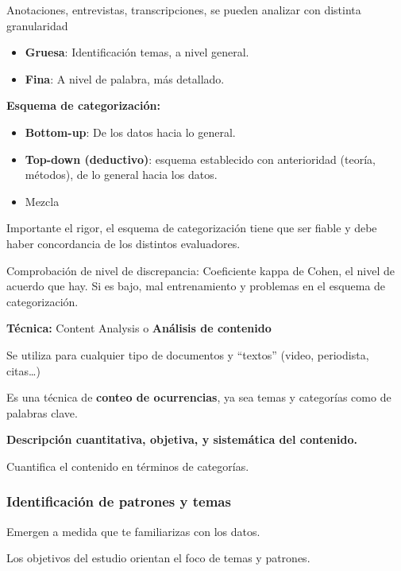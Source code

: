 \documentclass[12pt]{report} %
\begin{document}
Anotaciones, entrevistas, transcripciones, se pueden analizar con
distinta granularidad

\begin{itemize}

\item
  \textbf{Gruesa}: Identificación temas, a nivel general.
\item
  \textbf{Fina}: A nivel de palabra, más detallado.
\end{itemize}

\textbf{Esquema de categorización:}

\begin{itemize}

\item
  \textbf{Bottom-up}: De los datos hacia lo general.
\item
  \textbf{Top-down (deductivo)}: esquema establecido con anterioridad
  (teoría, métodos), de lo general hacia los datos.
\item
  Mezcla
\end{itemize}

Importante el rigor, el esquema de categorización tiene que ser fiable y
debe haber concordancia de los distintos evaluadores.

Comprobación de nivel de discrepancia: Coeficiente kappa de Cohen, el
nivel de acuerdo que hay. Si es bajo, mal entrenamiento y problemas en
el esquema de categorización.

\textbf{Técnica:} Content Analysis o \textbf{Análisis de contenido}

Se utiliza para cualquier tipo de documentos y ``textos'' (video,
periodista, citas\ldots)

Es una técnica de \textbf{conteo de ocurrencias}, ya sea temas y
categorías como de palabras clave.

\textbf{Descripción cuantitativa, objetiva, y sistemática del
contenido.}

Cuantifica el contenido en términos de categorías.

\hypertarget{identificaciuxf3n-de-patrones-y-temas}{%
\subsubsection{Identificación de patrones y
temas}\label{identificaciuxf3n-de-patrones-y-temas}}

Emergen a medida que te familiarizas con los datos.

Los objetivos del estudio orientan el foco de temas y patrones.
\end{document}
